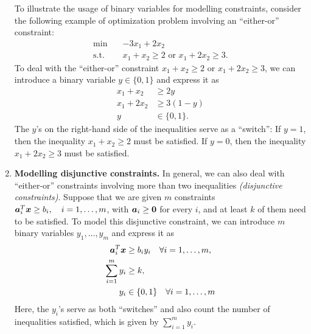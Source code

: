 \begin{enumerate}
To illustrate the usage of binary variables for modelling constraints, consider
the following example of optimization problem involving an ``either-or''
constraint:
\begin{align*}
\text{min}\quad&-3x_1+2x_2 \\
\text{s.t.}\quad&x_1+x_2\ge 2\text{ or }x_1+2x_2\ge 3.
\end{align*}
To deal with the ``either-or'' constraint \(x_1+x_2\ge 2\text{ or }x_1+2x_2\ge
3\), we can introduce a binary variable \(y\in\{0,1\}\) and express it as
\begin{align*}
x_1+x_2&\ge 2y \\
x_1+2x_2&\ge 3(1-y) \\
y&\in\{0,1\}.
\end{align*}
The \(y\)'s on the right-hand side of the inequalities serve as a ``switch'':
If \(y=1\), then the inequality \(x_1+x_2\ge 2\) must be satisfied. If
\(y=0\), then the inequality \(x_1+2x_2\ge 3\) must be satisfied.
\item\label{it:model-disj-const} \textbf{Modelling disjunctive constraints.} In general, we
can also deal with ``either-or'' constraints involving more than two
inequalities \emph{(disjunctive constraints)}. Suppose that we are given \(m\)
constraints \(\bm{a}_{i}^{T}\bm{x}\ge b_i,\quad i=1,\dotsc,m\), with
\(\bm{a}_i\ge\bm{0}\) for every \(i\), and at least \(k\) of them need to
be satisfied. To model this disjunctive constraint, we can introduce \(m\)
binary variables \(y_1,\dotsc,y_m\) and express it as
\begin{align*}
\bm{a}_{i}^{T}\bm{x}&\ge b_iy_i\quad\forall i=1,\dotsc,m, \\
\sum_{i=1}^{m}y_i&\ge k, \\
y_i&\in\{0,1\}\quad\forall i=1,\dotsc,m
\end{align*}
Here, the \(y_i\)'s serve as both ``switches'' and also count the number of
inequalities satisfied, which is given by \(\sum_{i=1}^{m}y_i\).
\end{enumerate}

